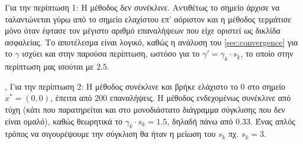 Για την περίπτωση 1:\newline
Η μέθοδος δεν συνέκλινε. Αντιθέτως το σημείο άρχισε να ταλαντώνεται γύρω από το σημείο ελαχίστου επ' αόριστον και η μέθοδος τερμάτισε μόνο όταν έφτασε τον μέγιστο αριθμό επαναλήψεων που είχε οριστεί ως δικλίδα ασφαλείας. Το αποτέλεσμα είναι λογικό, καθώς η ανάλυση του \cref{sec:convergence} για το $\gamma$ ισχύει και στην παρούσα περίπτωση, ωστόσο για το $\gamma' = \gamma_k \cdot s_k$, το οποίο στην περίπτωση μας ισούται με $2.5$.
\begin{figure}[!h]
    \centering
    \hfill
\end{figure}
\sep
Για την περίπτωση 2:\newline
H μέθοδος συνέκλινε και βρήκε ελάχιστο το $0$ στο σημείο $x^* = (0, 0)$, έπειτα από 200 επαναλήψεις. Η μέθοδος ενδεχομένως συνέκλινε από τύχη (κάτι που παρατηρείται και στο μονοδιάστατο διάγραμμα σύγκλισης που δεν είναι ομαλό), καθώς θεωρητικά το $\gamma_k \cdot s_k = 1.5$, δηλαδή πάνω από 0.33. Ένας απλός τρόπος να σιγουρέψουμε την σύγκλιση θα ήταν η μείωση του $s_k$ πχ. $s_k = 3$.

